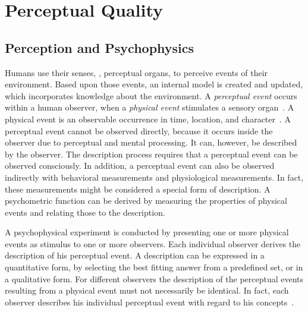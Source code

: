 \section{Perceptual Quality}
\subsection{Perception and Psychophysics}
Humans use their senses, \ie, perceptual organs, to perceive events of their environment.
Based upon those events, an internal model is created and updated, which incorporates knowledge about the environment.
A \emph{perceptual event} occurs within a human observer, when a \emph{physical event} stimulates a sensory organ~\citep[p.~5]{blauert_spatial_1996}.
A physical event is an observable occurrence in time, location, and character~\citep{le_callet_qualinet_2013}.
A perceptual event cannot be observed directly, because it occurs inside the observer due to perceptual and mental processing.
It can, however, be described by the observer.
The description process requires that a perceptual event can be observed consciously.
In addition, a perceptual event can also be observed indirectly with behavioral measurements and physiological measurements.
In fact, these measurements might be considered a special form of description.
A psychometric function can be derived by measuring the properties of physical events and relating those to the description.

A psychophysical experiment is conducted by presenting one or more physical events as stimulus to one or more observers.
Each individual observer derives the description of his perceptual event.
A description can be expressed in a quantitative form, by selecting the best fitting answer from a predefined set, or in a qualitative form.
For different observers the description of the perceptual events resulting from a physical event must not necessarily be identical.
In fact, each observer describes his individual perceptual event with regard to his concepts~\citep[p.~11]{blauert_spatial_1996}.

